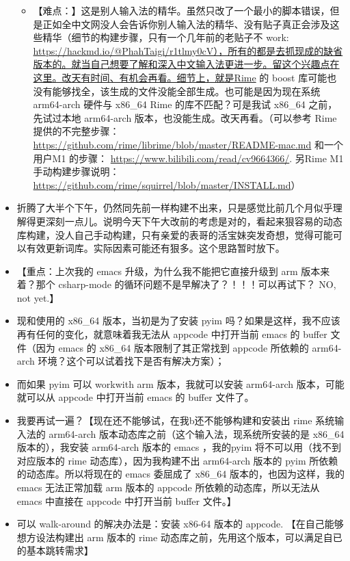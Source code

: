 \documentclass[9pt, b5paper]{article}
\begin{document}
\begin{itemize}
\begin{itemize}
\item 【难点：】这是别人输入法的精华。虽然只改了一个最小的脚本错误，但是正如全中文网没人会告诉你别人输入法的精华、没有贴子真正会涉及这些精华（细节的构建步骤，只有一个几年前的老贴子不 work: \url{https://hackmd.io/@PhahTaigi/r1tlmy0cV），所有的都是去抓现成的缺省版本的。就当自己想要了解和深入中文输入法更进一步。留这个兴趣点在这里。改天有时间、有机会再看。细节上，就是Rime} 的 boost 库可能也没有能够找全，该生成的文件没能全部生成。也可能是因为现在系统 arm64-arch 硬件与 x86\_64 Rime 的库不匹配？可是我试 x86\_64 之前，先试过本地 arm64-arch 版本，也没能生成。改天再看。（可以参考 Rime 提供的不完整步骤：\url{https://github.com/rime/librime/blob/master/README-mac.md} 和一个用户M1 的步骤： \url{https://www.bilibili.com/read/cv9664366/}. 另Rime M1 手动构建步骤说明：\url{https://github.com/rime/squirrel/blob/master/INSTALL.md}）
\end{itemize}
\item 折腾了大半个下午，仍然同先前一样构建不出来，只是感觉比前几个月似乎理解得更深刻一点儿。说明今天下午大改前的考虑是对的，看起来狠容易的动态库构建，没人自己手动构建，只有亲爱的表哥的活宝妹突发奇想，觉得可能可以有效更新词库。实际因素可能还有狠多。这个思路暂时放下。
\item 【重点：上次我的 emacs 升级，为什么我不能把它直接升级到 arm 版本来着？那个 csharp-mode 的循环问题不是早解决了？！！！可以再试下？ NO, not yet.】
\item 现和使用的 x86\_64 版本，当初是为了安装 pyim 吗？如果是这样，我不应该再有任何的变化，就意味着我无法从 appcode 中打开当前 emacs 的 buffer 文件（因为 emacs 的 x86\_64 版本限制了其正常找到 appcode 所依赖的 arm64-arch 环境？这个可以试着找下是否有解决方案）；
\item 而如果 pyim 可以 workwith arm 版本，我就可以安装 arm64-arch 版本，可能就可以从 appcode 中打开当前 emacs 的 buffer 文件了。
\item 我要再试一遍？【现在还不能够试，在我b还不能够构建和安装出 rime 系统输入法的 arm64-arch 版本动态库之前（这个输入法，现系统所安装的是 x86\_64 版本的），我安装 arm64-arch 版本的 emacs ，我的pyim 将不可以用（找不到对应版本的 rime 动态库），因为我构建不出 arm64-arch 版本的 pyim 所依赖的动态库。所以将现在的 emacs 委屈成了 x86\_64 版本的，也因为这样，我的 emacs 无法正常加载 arm 版本的 appcode 所依赖的动态库，所以无法从 emacs 中直接在 appcode 中打开当前 buffer 文件。】
\item 可以 walk-around 的解决办法是：安装 x86-64 版本的 appcode. 【在自己能够想方设法构建出 arm 版本的 rime 动态库之前，先用这个版本，可以满足自已的基本跳转需求】
\end{itemize}
\end{document}

